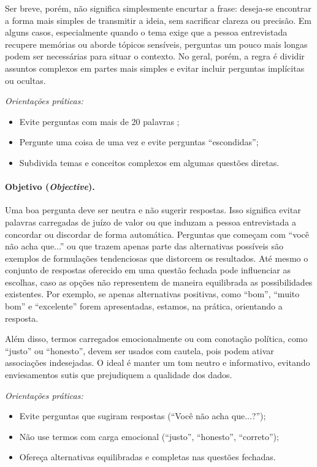 \documentclass[12pt, a4paper, openany]{book}
\begin{document}
Ser breve, por\'em, n\~ao significa simplesmente encurtar a frase: deseja-se encontrar a forma mais simples de transmitir a ideia, sem sacrificar clareza ou precis\~ao. Em alguns casos, especialmente quando o tema exige que a pessoa entrevistada recupere mem\'orias ou aborde t\'opicos sens\'iveis, perguntas um pouco mais longas podem ser necess\'arias para situar o contexto. No geral, por\'em, a regra \'e dividir assuntos complexos em partes mais simples e evitar incluir perguntas impl\'icitas ou ocultas.

\textit{Orienta\c{c}\~oes pr\'aticas:}
\begin{itemize}
\item Evite perguntas com mais de 20 palavras \citep{payne1951art};
\item Pergunte uma coisa de uma vez e evite perguntas ``escondidas'';
\item Subdivida temas e conceitos complexos em algumas quest\~oes diretas.
\end{itemize}

\paragraph{Objetivo (\textit{Objective}).} Uma boa pergunta deve ser neutra e n\~ao sugerir respostas. Isso significa evitar palavras carregadas de ju\'izo de valor ou que induzam a pessoa entrevistada a concordar ou discordar de forma autom\'atica. Perguntas que come\c{c}am com ``voc\^e n\~ao acha que...'' ou que trazem apenas parte das alternativas poss\'iveis s\~ao exemplos de formula\c{c}\~oes tendenciosas que distorcem os resultados. At\'e mesmo o conjunto de respostas oferecido em uma quest\~ao fechada pode influenciar as escolhas, caso as op\c{c}\~oes n\~ao representem de maneira equilibrada as possibilidades existentes. Por exemplo, se apenas alternativas positivas, como ``bom'', ``muito bom'' e ``excelente'' forem apresentadas, estamos, na pr\'atica, orientando a resposta.

Al\'em disso, termos carregados emocionalmente ou com conota\c{c}\~ao pol\'itica, como ``justo'' ou ``honesto'', devem ser usados com cautela, pois podem ativar associa\c{c}\~oes indesejadas. O ideal \'e manter um tom neutro e informativo, evitando enviesamentos sutis que prejudiquem a qualidade dos dados.

\textit{Orienta\c{c}\~oes pr\'aticas:}
\begin{itemize}
\item Evite perguntas que sugiram respostas (``Voc\^e n\~ao acha que...?'');
\item N\~ao use termos com carga emocional (``justo'', ``honesto'', ``correto'');
\item Ofere\c{c}a alternativas equilibradas e completas nas quest\~oes fechadas.
\end{itemize}
\end{document}
